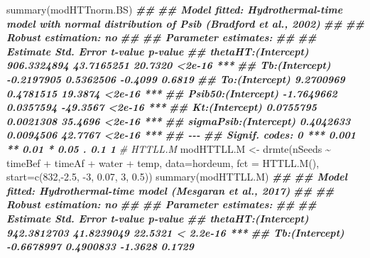 \documentclass[
]{book}
\newenvironment{Shaded}{\begin{snugshade}}{\end{snugshade}}
\newcommand{\AttributeTok}[1]{\textcolor[rgb]{0.77,0.63,0.00}{#1}}
\newcommand{\CommentTok}[1]{\textcolor[rgb]{0.56,0.35,0.01}{\textit{#1}}}
\newcommand{\DecValTok}[1]{\textcolor[rgb]{0.00,0.00,0.81}{#1}}
\newcommand{\DocumentationTok}[1]{\textcolor[rgb]{0.56,0.35,0.01}{\textbf{\textit{#1}}}}
\newcommand{\FloatTok}[1]{\textcolor[rgb]{0.00,0.00,0.81}{#1}}
\newcommand{\FunctionTok}[1]{\textcolor[rgb]{0.00,0.00,0.00}{#1}}
\newcommand{\NormalTok}[1]{#1}
\newcommand{\OtherTok}[1]{\textcolor[rgb]{0.56,0.35,0.01}{#1}}
\newcommand{\SpecialCharTok}[1]{\textcolor[rgb]{0.00,0.00,0.00}{#1}}
\begin{document}
\begin{Shaded}
\begin{Highlighting}[]
\FunctionTok{summary}\NormalTok{(modHTTnorm.BS)}
\DocumentationTok{\#\# }
\DocumentationTok{\#\# Model fitted: Hydrothermal{-}time model with normal distribution of Psib (Bradford et al., 2002)}
\DocumentationTok{\#\# }
\DocumentationTok{\#\# Robust estimation: no }
\DocumentationTok{\#\# }
\DocumentationTok{\#\# Parameter estimates:}
\DocumentationTok{\#\# }
\DocumentationTok{\#\#                          Estimate  Std. Error  t{-}value p{-}value    }
\DocumentationTok{\#\# thetaHT:(Intercept)   906.3324894  43.7165251  20.7320  \textless{}2e{-}16 ***}
\DocumentationTok{\#\# Tb:(Intercept)         {-}0.2197905   0.5362506  {-}0.4099  0.6819    }
\DocumentationTok{\#\# To:(Intercept)          9.2700969   0.4781515  19.3874  \textless{}2e{-}16 ***}
\DocumentationTok{\#\# Psib50:(Intercept)     {-}1.7649662   0.0357594 {-}49.3567  \textless{}2e{-}16 ***}
\DocumentationTok{\#\# Kt:(Intercept)          0.0755795   0.0021308  35.4696  \textless{}2e{-}16 ***}
\DocumentationTok{\#\# sigmaPsib:(Intercept)   0.4042633   0.0094506  42.7767  \textless{}2e{-}16 ***}
\DocumentationTok{\#\# {-}{-}{-}}
\DocumentationTok{\#\# Signif. codes:  0 \textquotesingle{}***\textquotesingle{} 0.001 \textquotesingle{}**\textquotesingle{} 0.01 \textquotesingle{}*\textquotesingle{} 0.05 \textquotesingle{}.\textquotesingle{} 0.1 \textquotesingle{} \textquotesingle{} 1}
\CommentTok{\# HTTLL.M}
\NormalTok{modHTTLL.M }\OtherTok{\textless{}{-}} \FunctionTok{drmte}\NormalTok{(nSeeds }\SpecialCharTok{\textasciitilde{}}\NormalTok{ timeBef }\SpecialCharTok{+}\NormalTok{ timeAf }\SpecialCharTok{+}\NormalTok{ water }\SpecialCharTok{+}\NormalTok{ temp,}
                 \AttributeTok{data=}\NormalTok{hordeum,}
                 \AttributeTok{fct =} \FunctionTok{HTTLL.M}\NormalTok{(),}
  \AttributeTok{start=}\FunctionTok{c}\NormalTok{(}\DecValTok{832}\NormalTok{,}\SpecialCharTok{{-}}\FloatTok{2.5}\NormalTok{, }\SpecialCharTok{{-}}\DecValTok{3}\NormalTok{, }\FloatTok{0.07}\NormalTok{, }\DecValTok{3}\NormalTok{, }\FloatTok{0.5}\NormalTok{))}
\FunctionTok{summary}\NormalTok{(modHTTLL.M)}
\DocumentationTok{\#\# }
\DocumentationTok{\#\# Model fitted: Hydrothermal{-}time model (Mesgaran et al., 2017)}
\DocumentationTok{\#\# }
\DocumentationTok{\#\# Robust estimation: no }
\DocumentationTok{\#\# }
\DocumentationTok{\#\# Parameter estimates:}
\DocumentationTok{\#\# }
\DocumentationTok{\#\#                          Estimate  Std. Error  t{-}value   p{-}value    }
\DocumentationTok{\#\# thetaHT:(Intercept)   942.3812703  41.8239049  22.5321 \textless{} 2.2e{-}16 ***}
\DocumentationTok{\#\# Tb:(Intercept)         {-}0.6678997   0.4900833  {-}1.3628    0.1729    }

\end{Highlighting}
\end{Shaded}
\end{document}
